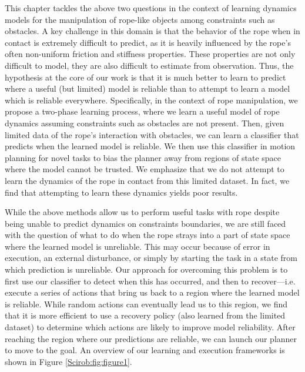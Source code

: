 This chapter tackles the above two questions in the context of learning dynamics models for the manipulation of rope-like objects among constraints such as obstacles. A key challenge in this domain is that the behavior of the rope when in contact is extremely difficult to predict, as it is heavily influenced by the rope’s often non-uniform friction and stiffness properties. These properties are not only difficult to model, they are also difficult to estimate from observation. Thus, the hypothesis at the core of our work is that it is much better to learn to predict where a useful (but limited) model is reliable than to attempt to learn a model which is reliable everywhere. Specifically, in the context of rope manipulation, we propose a two-phase learning process, where we learn a useful model of rope dynamics assuming constraints such as obstacles are not present. Then, given limited data of the rope’s interaction with obstacles, we can learn a classifier that predicts when the learned model is reliable. We then use this classifier in motion planning for novel tasks to bias the planner away from regions of state space where the model cannot be trusted. We emphasize that we do not attempt to learn the dynamics of the rope in contact from this limited dataset. In fact, we find that attempting to learn these dynamics yields poor results.

While the above methods allow us to perform useful tasks with rope despite being unable to predict dynamics on constraints boundaries, we are still faced with the question of what to do when the rope strays into a part of state space where the learned model is unreliable. This may occur because of error in execution, an external disturbance, or simply by starting the task in a state from which prediction is unreliable. Our approach for overcoming this problem is to first use our classifier to detect when this has occurred, and then to recover—i.e. execute a series of actions that bring us back to a region where the learned model is reliable. While random actions can eventually lead us to this region, we find that it is more efficient to use a recovery policy (also learned from the limited dataset) to determine which actions are likely to improve model reliability. After reaching the region where our predictions are reliable, we can launch our planner to move to the goal. An overview of our learning and execution frameworks is shown in Figure \ref{Scirob:fig:figure1}.

